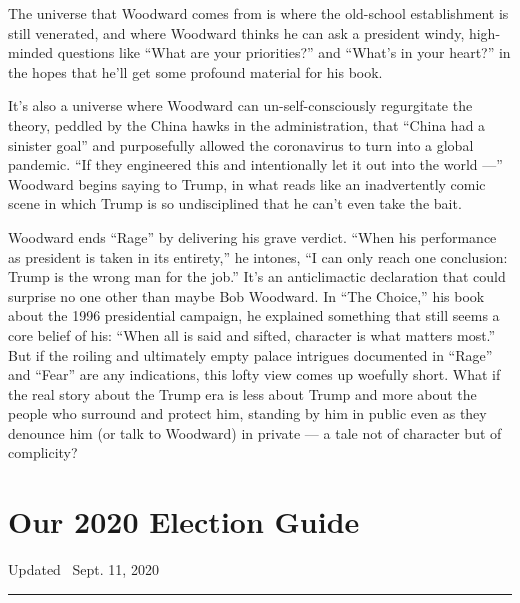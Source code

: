 The universe that Woodward comes from is where the old-school
establishment is still venerated, and where Woodward thinks he can ask a
president windy, high-minded questions like ``What are your
priorities?'' and ``What's in your heart?'' in the hopes that he'll get
some profound material for his book.

It's also a universe where Woodward can un-self-consciously regurgitate
the theory, peddled by the China hawks in the administration, that
``China had a sinister goal'' and purposefully allowed the coronavirus
to turn into a global pandemic. ``If they engineered this and
intentionally let it out into the world ---'' Woodward begins saying to
Trump, in what reads like an inadvertently comic scene in which Trump is
so undisciplined that he can't even take the bait.

Woodward ends ``Rage'' by delivering his grave verdict. ``When his
performance as president is taken in its entirety,'' he intones, ``I can
only reach one conclusion: Trump is the wrong man for the job.'' It's an
anticlimactic declaration that could surprise no one other than maybe
Bob Woodward. In ``The Choice,'' his book about the 1996 presidential
campaign, he explained something that still seems a core belief of his:
``When all is said and sifted, character is what matters most.'' But if
the roiling and ultimately empty palace intrigues documented in ``Rage''
and ``Fear'' are any indications, this lofty view comes up woefully
short. What if the real story about the Trump era is less about Trump
and more about the people who surround and protect him, standing by him
in public even as they denounce him (or talk to Woodward) in private ---
a tale not of character but of complicity?

\hypertarget{our-2020-election-guide}{%
\section{Our 2020 Election Guide}\label{our-2020-election-guide}}

Updated ~Sept. 11, 2020

\begin{center}\rule{0.5\linewidth}{\linethickness}\end{center}

